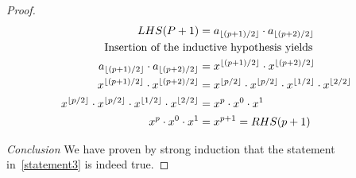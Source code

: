 \documentclass{article}
\begin{document}
\begin{proof}
\begin{align}
    \label{proof}
    LHS(P+1) &= a_{\lfloor (p+1)/2 \rfloor} \cdot a_{\lfloor (p+2)/2 \rfloor}\notag\\
     &\hspace{-3cm} \text{Insertion of the inductive hypothesis yields}\notag\\
     a_{\lfloor (p+1)/2 \rfloor} \cdot a_{\lfloor (p+2)/2 \rfloor} &= x^{\lfloor (p+1)/2 \rfloor} \cdot x^{\lfloor (p+2)/2 \rfloor}\notag\\
     x^{\lfloor (p+1)/2 \rfloor} \cdot x^{\lfloor (p+2)/2 \rfloor} &= x^{\lfloor p/2 \rfloor} \cdot x^{\lfloor p/2 \rfloor} \cdot x^{\lfloor 1/2 \rfloor} \cdot x^{\lfloor 2/2 \rfloor}\notag\\
     x^{\lfloor p/2 \rfloor} \cdot x^{\lfloor p/2 \rfloor} \cdot x^{\lfloor 1/2 \rfloor} \cdot x^{\lfloor 2/2 \rfloor} &= x^{p} \cdot x^0 \cdot x^1\notag\\
     x^{p} \cdot x^0 \cdot x^1 &= x^{p+1} = RHS(p+1)
\end{align}

\textit{Conclusion} We have proven by strong induction that the statement in~\cref{statement3} is indeed true.

\end{proof}
\end{document}
